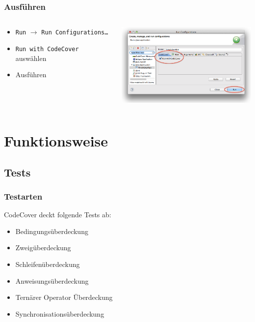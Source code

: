\documentclass{beamer}
\begin{document}
  \begin{frame}
    \frametitle{Ausführen}
    \begin{columns}
      \begin{column}{4cm}
        \begin{itemize}
          \item \texttt{Run} $\rightarrow$ \texttt{Run Configurations\dots}
          \item \texttt{Run with CodeCover} auswählen
          \item Ausführen
        \end{itemize}
        \vspace{2cm}
      \end{column}
      \begin{column}{6cm}
        \begin{overprint}
          \includegraphics[width=7cm]{pictures/runconfigurations.png}
        \end{overprint}
      \end{column}
    \end{columns}
  \end{frame}

  \section{Funktionsweise}
  \subsection{Tests}
  \begin{frame}\frametitle{Testarten}
  CodeCover deckt folgende Tests ab:
    \begin{itemize}[<+->]
      \item Bedingungsüberdeckung
      \item Zweigüberdeckung
      \item Schleifenüberdeckung
      \item Anweisungsüberdeckung
      \item Ternärer Operator Überdeckung
      \item Synchronisationsüberdeckung
    \end{itemize}
  \end{frame}
\end{document}
